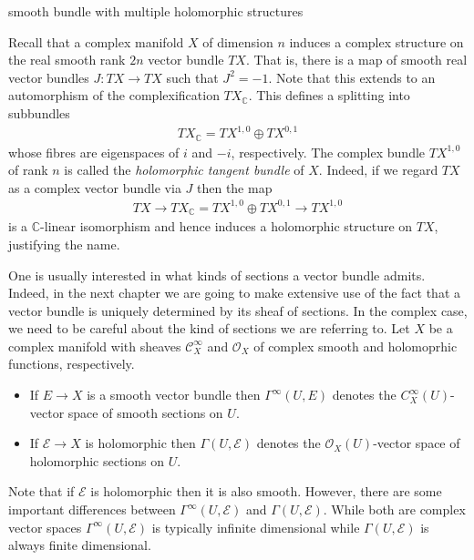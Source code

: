 \documentclass[12pt]{ociamthesis}  %
\begin{document}
\begin{example}
  smooth bundle with multiple holomorphic structures
  \missingexample
\end{example}

\begin{example}
  Recall that a complex manifold $X$ of dimension $n$ induces a
  complex structure on the real smooth rank $2n$ vector bundle $TX$.
  That is, there is a map of smooth real vector bundles
  $J : TX \to TX$ such that $J^2 = -1$. Note that this extends to
  an automorphism of the complexification $TX_{\mathbb{C}}$.
  This defines a splitting into subbundles
  \begin{align}\label{eq:tangent_decomposition}
    TX_{\mathbb{C}}  = TX^{1,0} \oplus TX^{0,1}
  \end{align}
  whose fibres are eigenspaces of $i$ and $-i$, respectively. The
  complex bundle $TX^{1,0}$ of rank $n$ is called the
  \emph{holomorphic tangent bundle} of $X$. Indeed, if we regard $TX$
  as a complex vector bundle via $J$ then the map
  \begin{align}\label{eq:holomorphic_tangent_bundle}
    TX
    \longrightarrow TX_{\mathbb C}
    = TX^{1,0} \oplus TX^{0,1}
    \longrightarrow TX^{1,0}
  \end{align}
  is a $\mathbb{C}$-linear isomorphism and hence induces a holomorphic
  structure on $TX$, justifying the name.
\end{example}

One is usually interested in what kinds of sections a vector bundle
admits. Indeed, in the next chapter we are going to make extensive use
of the fact that a vector bundle is uniquely determined by its sheaf
of sections. In the complex case, we need to be careful about the
kind of sections we are referring to. Let $X$ be a complex manifold
with sheaves $\mathscr C^\infty_X$ and $\mathscr O_X$ of complex smooth
and holomoprhic functions, respectively.

\begin{itemize}
  \item If $E\to X$ is a smooth vector bundle then $\Gamma^\infty(U,E)$
        denotes the $C^\infty_X(U)$-vector space of smooth sections on $U$.
  \item If $\mathcal E\to X$ is holomorphic then $\Gamma(U,\mathcal E)$
        denotes the $\mathscr O_X(U)$-vector space of holomorphic sections
        on $U$.
\end{itemize}

Note that if $\mathcal E$ is holomorphic then it is also smooth.
However, there are some important differences between
$\Gamma^\infty(U,\mathcal E)$ and $\Gamma(U,\mathcal E)$. While both are
complex vector spaces $\Gamma^\infty(U,\mathcal E)$ is typically infinite
dimensional while $\Gamma(U,\mathcal E)$ is always finite
dimensional.~\cite[Theorem 1.4.1]{ma2007}
\end{document}
